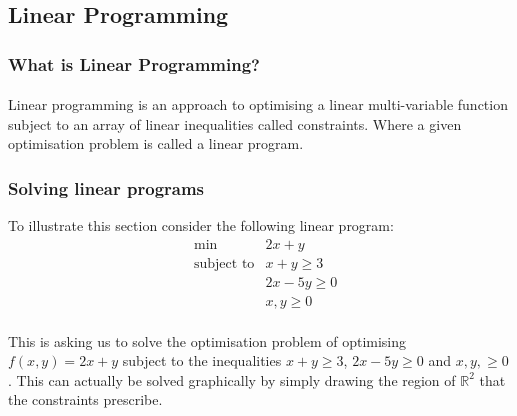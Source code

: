 \documentclass{article}
\begin{document}
\subsection{Linear Programming}
\subsubsection{What is Linear Programming?}
\paragraph{}Linear programming is an approach to optimising a linear multi-variable function subject to an array of linear inequalities called constraints. Where a given optimisation problem is called a linear program.

\subsubsection{Solving linear programs}
To illustrate this section consider the following linear program:
\begin{equation*}
\begin{aligned}
&\min & 2x+y \\
    &\text{subject to} & x + y \geq 3\\
    & & 2x-5y \geq 0 \\
    & & x,y \geq 0
\end{aligned}
\end{equation*}

\paragraph{}This is asking us to solve the optimisation problem of optimising $f(x,y) = 2x+y$ subject to the inequalities $x+y \geq 3$, $2x-5y \geq 0$ and $x,y,\geq 0$. This can actually be solved graphically by simply drawing the region of $\mathbb{R}^2$ that the constraints prescribe.

\pagebreak
\end{document}
